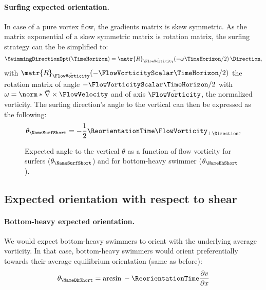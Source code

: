 \paragraph{Surfing expected orientation.}
In case of a pure vortex flow, the gradients matrix is skew symmetric.
As the matrix exponential of a skew symmetric matrix is rotation matrix, the surfing strategy can the be simplified to:
\begin{equation}
	\label{eq:optimal_swimming_direction_partial_asym}
	\SwimmingDirectionOpt(\TimeHorizon) = \matr{R}_{\hat{\FlowVorticity}}(-\omega \TimeHorizon/2) \, \Direction,
\end{equation}
with $\matr{R}_{\hat{\FlowVorticity}}(-\FlowVorticityScalar \TimeHorizon/2)$ the rotation matrix of angle $-\FlowVorticityScalar \TimeHorizon/2$ with $\omega = \norm*{\vec{\nabla} \times \FlowVelocity}$ and of axis $\hat{\FlowVorticity}$, the normalized vorticity.
The surfing direction's angle to the vertical can then be expressed as the following:
\begin{equation}\label{eq:surfing_orientation}
	\theta_{\mathrm{\NameSurfShort}} = -\frac{1}{2} \ReorientationTime \FlowVorticity_{\perp \Direction},
\end{equation}

\begin{figure}%
	\centering
	
	\caption{
		Expected angle to the vertical $\theta$ as a function of flow vorticity for surfers ($\theta_{\mathrm{\NameSurfShort}}$) and for bottom-heavy swimmer ($\theta_{\mathrm{\NameBhShort}}$).
	}
	\label{fig:vorticity_angle_to_the_vertical}
\end{figure}

\subsection{Expected orientation with respect to shear}

\paragraph{Bottom-heavy expected orientation.}
We would expect bottom-heavy swimmers to orient with the underlying average vorticity.
In that case, bottom-heavy swimmers would orient preferentially towards their average equilibrium orientation (same as before):
\begin{equation}\label{eq:spherical_bottom_heavy_orientation}
	\theta_{\mathrm{\NameBhShort}} = \mathrm{arcsin} \, -\ReorientationTime \frac{\partial v}{\partial x}
\end{equation}

